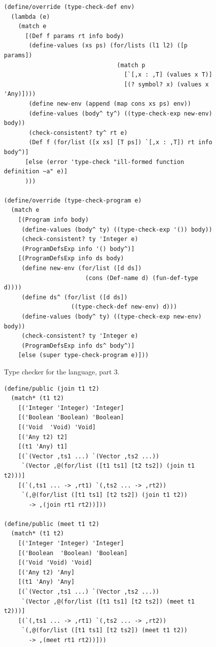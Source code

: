 \documentclass[7x10]{TimesAPriori_MIT}%
\numberwithin{theorem}{chapter}
\numberwithin{definition}{chapter}
\numberwithin{equation}{chapter}
\begin{document}
{\begin{figure}[tbp]
\begin{tcolorbox}[colback=white]
\begin{lstlisting}
(define/override (type-check-def env)
  (lambda (e)
    (match e
      [(Def f params rt info body)
       (define-values (xs ps) (for/lists (l1 l2) ([p params])
                                (match p
                                  [`[,x : ,T] (values x T)]
                                  [(? symbol? x) (values x 'Any)])))
       (define new-env (append (map cons xs ps) env))
       (define-values (body^ ty^) ((type-check-exp new-env) body))
       (check-consistent? ty^ rt e)
       (Def f (for/list ([x xs] [T ps]) `[,x : ,T]) rt info body^)]
      [else (error 'type-check "ill-formed function definition ~a" e)]
      )))

(define/override (type-check-program e)
  (match e
    [(Program info body)
     (define-values (body^ ty) ((type-check-exp '()) body))
     (check-consistent? ty 'Integer e)
     (ProgramDefsExp info '() body^)]
    [(ProgramDefsExp info ds body)
     (define new-env (for/list ([d ds]) 
                       (cons (Def-name d) (fun-def-type d))))
     (define ds^ (for/list ([d ds])
                   ((type-check-def new-env) d)))
     (define-values (body^ ty) ((type-check-exp new-env) body))
     (check-consistent? ty 'Integer e)
     (ProgramDefsExp info ds^ body^)]
    [else (super type-check-program e)]))
\end{lstlisting}
\end{tcolorbox}
\caption{Type checker for the \LangGrad{} language, part 3.}
\label{fig:type-check-Lgradual-3}
\end{figure}

\begin{figure}[tbp]
\begin{tcolorbox}[colback=white]  
\begin{lstlisting}
(define/public (join t1 t2)
  (match* (t1 t2)
    [('Integer 'Integer) 'Integer]
    [('Boolean 'Boolean) 'Boolean]
    [('Void  'Void) 'Void]
    [('Any t2) t2]
    [(t1 'Any) t1]
    [(`(Vector ,ts1 ...) `(Vector ,ts2 ...))
     `(Vector ,@(for/list ([t1 ts1] [t2 ts2]) (join t1 t2)))]
    [(`(,ts1 ... -> ,rt1) `(,ts2 ... -> ,rt2))
     `(,@(for/list ([t1 ts1] [t2 ts2]) (join t1 t2))
       -> ,(join rt1 rt2))]))

(define/public (meet t1 t2)
  (match* (t1 t2)
    [('Integer 'Integer) 'Integer]
    [('Boolean  'Boolean) 'Boolean]
    [('Void 'Void) 'Void]
    [('Any t2) 'Any]
    [(t1 'Any) 'Any]
    [(`(Vector ,ts1 ...) `(Vector ,ts2 ...))
     `(Vector ,@(for/list ([t1 ts1] [t2 ts2]) (meet t1 t2)))]
    [(`(,ts1 ... -> ,rt1) `(,ts2 ... -> ,rt2))
     `(,@(for/list ([t1 ts1] [t2 ts2]) (meet t1 t2))
       -> ,(meet rt1 rt2))]))


\end{lstlisting}
\end{tcolorbox}
\end{figure}}
\end{document}
